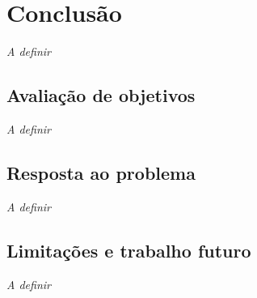 \chapter{Conclusão}
\label{chap:Chapter5}

\textit{A definir}

\section{Avaliação de objetivos} 
\label{sec:chap5_goals_evaluation}

\textit{A definir}

\section{Resposta ao problema} 
\label{sec:chap5_problem_response}

\textit{A definir}

\section{Limitações e trabalho futuro} 
\label{sec:chap5_future_work_limitations}

\textit{A definir}
